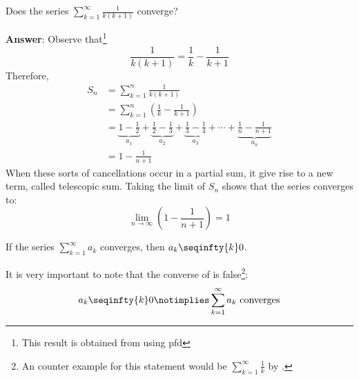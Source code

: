 \begin{exm}\label{exm-sequence-series:5}
	Does the series $\sum_{k=1}^\infty \frac{1}{k(k+1)}$ converge?
	\begin{flushleft}
		\textbf{Answer}: Observe that\footnote{This result is obtained from using \gls{pfd}}
		\begin{equation*}
			\frac{1}{k(k+1)} = \frac{1}{k} - \frac{1}{k+1}
		\end{equation*}
		Therefore,
		\begin{align*}
			S_n & = \sum_{k=1}^n \frac{1}{k(k+1)}                                                                                                                                                      \\
			    & = \sum_{k=1}^n \left(\frac{1}{k} - \frac{1}{k+1}\right)                                                                                                                              \\
			    & = \underbrace{1-\frac{1}{2}}_{a_1} + \underbrace{\frac{1}{2}-\frac{1}{3}}_{a_2} + \underbrace{\frac{1}{3}-\frac{1}{4}}_{a_3} + \cdots + \underbrace{\frac{1}{n}-\frac{1}{n+1}}_{a_n} \\
			    & = 1 - \frac{1}{n+1}
		\end{align*}
		When these sorts of cancellations occur in a partial sum, it give rise to
		a new term, called telescopic sum. Taking the limit of $S_n$ shows that
		the series converges to:
		\begin{equation*}
			\lim_{n\to\infty} \left(1 - \frac{1}{n+1}\right) = 1
		\end{equation*}
	\end{flushleft}
\end{exm}

\begin{thm}\label{thm-series-converges-sequence-zero}
	If the series $\sum_{k=1}^\infty a_k$ converges, then $a_k \seqinfty{k} 0$.
\end{thm}

\begin{rem}\label{rem-series-converges-sequence-zero}
	It is very important to note that the converse of 
	is false\footnote{An counter example for this statement would be $\sum_{k=1}^\infty \tfrac{1}{k}$
		by .}:
	\begin{equation*}
		a_k \seqinfty{k} 0 \notimplies \sum_{k=1}^\infty a_k \text{ converges}
	\end{equation*}
\end{rem}

